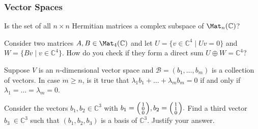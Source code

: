 \documentclass[a4paper,oneside, 12pt]{amsart}
\begin{document}
\subsubsection*{Vector Spaces}
\begin{thmlist}
  \item Is the set of all \(n \times n\) Hermitian matrices a complex subspace of \(\Mat_n(\mathbb{C})\)?
  \item Consider two matrices \(A, B \in \Mat_{4}( \mathbb{C})\) and let \(U =\{v \in \mathbb{C}^{4} \mid Uv = 0\}\) and \(W =\{Bv \mid v \in \mathbb{C}^{4}\}\).
  How do you check if they form a direct sum \(U \oplus W = \mathbb{C}^4\)?
  \item Suppose \(V\) is an \(n\)-dimensional vector space and \(\mathcal{B}=(b_{1}, \dots , b_{m})\) is a collection of vectors.
  In case \(m\geq n\), is it true that \(\lambda_{1}b_{1} + \dots + \lambda_{m} b_{m} = 0\)  if and only if \(\lambda_{1} = \dots = \lambda_{m} = 0 \).
  \item Consider the vectors \(b_{1}, b_{2} \in \mathbb{C}^{3}\) with \(
  b_{1} = \begin{psmallmatrix}
    1 \\ 0 \\ 0
  \end{psmallmatrix},
  b_{2} = \begin{psmallmatrix}
    1 \\ 1 \\ 0
  \end{psmallmatrix}.
  \)
  Find a third vector \(b_{3}\ \in \mathbb{C}^{3}\) such that \((b_{1}, b_{2}, b_{3})\) is a basis of \( \mathbb{C}^{3}\). Justify your answer.
\end{thmlist}
\end{document}
